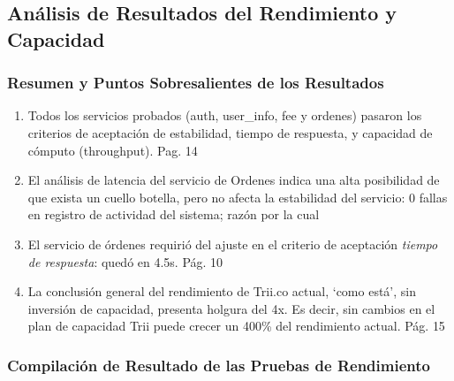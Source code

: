 \documentclass[
  paper=a4,
  ,captions=tableheading
]{scrartcl}
\providecommand{\tightlist}{%
  \setlength{\itemsep}{0pt}\setlength{\parskip}{0pt}}
\renewenvironment{quote}{\begin{customblockquote}\list{}{\rightmargin=0em\leftmargin=0em}%
\item\relax\color{blockquote-text}\ignorespaces}{\unskip\unskip\endlist\end{customblockquote}}
\begin{document}
\subsection{Análisis de Resultados del Rendimiento y
Capacidad}\label{sec:anuxe1lisis-de-resultados-del-rendimiento-y-capacidad}

\begin{quote}
\end{quote}

\subsubsection{Resumen y Puntos Sobresalientes de los
Resultados}\label{sec:resumen-y-puntos-sobresalientes-de-los-resultados}

\begin{enumerate}
\def\labelenumi{\arabic{enumi}.}
\tightlist
\item
  Todos los servicios probados (auth, user\_info, fee y ordenes) pasaron
  los criterios de aceptación de estabilidad, tiempo de respuesta, y
  capacidad de cómputo (throughput). Pag. 14
\item
  El análisis de latencia del servicio de Ordenes indica una alta
  posibilidad de que exista un cuello botella, pero no afecta la
  estabilidad del servicio: 0 fallas en registro de actividad del
  sistema; razón por la cual
\item
  El servicio de órdenes requirió del ajuste en el criterio de
  aceptación \emph{tiempo de respuesta}: quedó en 4.5s. Pág. 10
\item
  La conclusión general del rendimiento de Trii.co actual, `como está',
  sin inversión de capacidad, presenta holgura del 4x. Es decir, sin
  cambios en el plan de capacidad Trii puede crecer un 400\% del
  rendimiento actual. Pág. 15
\end{enumerate}

\subsubsection{Compilación de Resultado de las Pruebas de
Rendimiento}\label{sec:compilaciuxf3n-de-resultado-de-las-pruebas-de-rendimiento}
\end{document}

